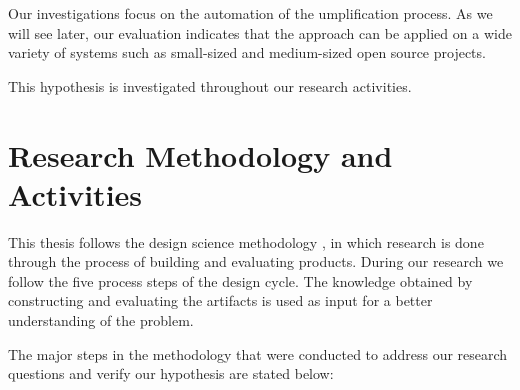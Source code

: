 Our investigations focus on the automation of the umplification process. As we will see later, our evaluation indicates that the approach can be applied on a wide variety of systems such as small-sized  and medium-sized open source projects. 


This hypothesis is investigated throughout our research activities.

\section{Research Methodology and Activities}
This thesis follows the design science methodology \cite{designscience}, in which research is done through the process of building and evaluating products. During our research we follow the five process steps of the design cycle. The knowledge obtained by constructing and evaluating the artifacts is used as input for a better understanding of the problem. 

The major steps in the methodology that were conducted to address our research questions and verify our hypothesis are stated below:

